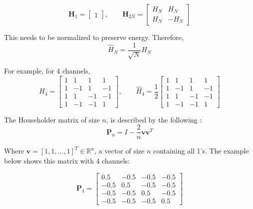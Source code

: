 \begin{equation}\label{eq:hadamard}
    \mathbf{H}_1 = \begin{bmatrix} 1 \end{bmatrix}, \qquad
    \mathbf{H}_{2N} = \begin{bmatrix} H_N & H_N \\ H_N & -H_N \end{bmatrix}
\end{equation}

This needs to be normalized to preserve energy. Therefore,
\begin{equation}\label{eq:hadamard_norm}
    \hat{H}_N = \frac{1}{\sqrt{N}}H_N
\end{equation}

For example, for 4 channels,
$$
    H_4 = \begin{bmatrix}
        1 & 1 & 1 & 1 \\
        1 & -1 & 1 & -1 \\
        1 & 1 & -1 & -1 \\
        1 & -1 & -1 & 1
    \end{bmatrix}, \qquad
    \hat{H}_4 = \frac{1}{2}\begin{bmatrix}
        1 & 1 & 1 & 1 \\
        1 & -1 & 1 & -1 \\
        1 & 1 & -1 & -1 \\
        1 & -1 & -1 & 1
    \end{bmatrix}
$$

The Householder matrix of size $n$, is described by the following \cite{higham2020householder}:
\begin{equation}\label{eq:householder-general}
    \mathbf{P}_n = I - \frac{2}{n} \mathbf{v} \mathbf{v}^T
\end{equation}

Where $\mathbf{v} = [1, 1, \dots, 1]^T \in \mathbb{R}^n$, a vector of size $n$ containing all 1's. The example below shows this matrix with
4 channels:

$$
    \mathbf{P}_4 = \begin{bmatrix}
        0.5 & -0.5 & -0.5 & -0.5 \\
        -0.5 & 0.5 & -0.5 & -0.5 \\
        -0.5 & -0.5 & 0.5 & -0.5 \\
        -0.5 & -0.5 & -0.5 & 0.5
    \end{bmatrix}
    \label{eq:householder}
$$

